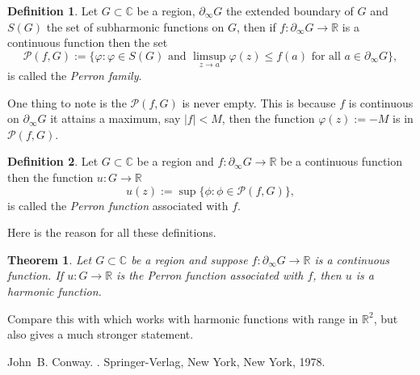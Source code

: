 \documentclass[12pt]{article}
\theoremstyle{theorem}
\newtheorem*{thm}{Theorem}
\theoremstyle{definition}
\newtheorem*{defn}{Definition}
\begin{document}
\begin{defn}
Let $G \subset {\mathbb{C}}$ be a region, $\partial_\infty G$
the extended boundary of $G$ and $S(G)$ the set of subharmonic functions
on $G$, then
if $f \colon \partial_\infty G \to {\mathbb{R}}$ is a continuous
function then the set 
\begin{equation*}
{\mathcal{P}}(f,G) := \{ \varphi : \varphi \in S(G) \text{ and }
\limsup_{z \to a} \varphi(z) \leq f(a) \text{ for all $a \in \partial_\infty G$} \} ,
\end{equation*}
is called the {\em Perron family}.
\end{defn}

One thing to note is the ${\mathcal{P}}(f,G)$ is never empty.  This is because
$f$ is continuous on $\partial_\infty G$ it attains a maximum, say $|f| < M$,
then the function $\varphi(z) := -M$ is in ${\mathcal{P}}(f,G)$.

\begin{defn}
Let $G \subset {\mathbb{C}}$ be a region and
$f \colon \partial_\infty G \to {\mathbb{R}}$ be a continuous
function then the function $u \colon G \to {\mathbb{R}}$
\begin{equation*}
u(z) := \sup \{ \phi : \phi \in {\mathcal{P}}(f,G) \} ,
\end{equation*}
is called the {\em Perron function} associated with $f$.
\end{defn}

Here is the reason for all these definitions.

\begin{thm}
Let $G \subset {\mathbb{C}}$ be a region and suppose $f \colon
\partial_\infty G \to {\mathbb{R}}$ is a continuous function.
If $u \colon G \to {\mathbb{R}}$ is the Perron function associated
with $f$, then $u$ is a harmonic function.
\end{thm}

Compare this with  which works with
harmonic functions with range in ${\mathbb{R}}^2$, but also gives a much
stronger statement.

\begin{thebibliography}{9}
John~B. Conway.
{\em {}}.
Springer-Verlag, New York, New York, 1978.
\end{thebibliography}
\end{document}
